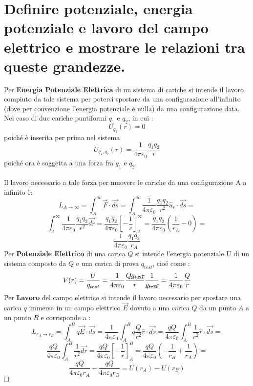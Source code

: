 \section{Definire potenziale, energia potenziale e lavoro del
	campo elettrico e mostrare le relazioni tra queste
	grandezze.}
Per \textbf{Energia Potenziale Elettrica} di un sistema di cariche si intende il lavoro compiuto da tale sistema per potersi spostare da una configurazione all'infinito (dove per convenzione l'energia potenziale \`e nulla) da una configurazione data.
Nel caso di due cariche puntiformi $q_1$ e $q_2$, in cui :
$$
   U_{q_1}(r) = 0 
$$
poich\'e \`e inserita per prima nel sistema
$$
   U_{q_1, q_2}(r) = \frac{1}{4 \pi \varepsilon_0} \frac{q_1 q_2}{r}
$$
poich\'e ora \`e soggetta a una forza fra $q_1$ e $q_2$.\\
\\
Il lavoro necessario a tale forza per muovere le cariche da una configurazione A a infinito  \`e:
$$
L_{A \rightarrow \infty} = 
\int_A^{\infty}{\vec{F} \cdot \vec{ds}} = 
\int_A^{\infty}{
	\frac{1}{4 \pi \varepsilon_0} \frac{q_1 q_2}{r^2}\hat{u}_r \cdot \vec{ds}
} =
$$
$$
  \int_A^{\infty}{
  	\frac{1}{4 \pi \varepsilon_0} \frac{q_1 q_2}{r^2}\vec{dr}
  } = 
  \frac{q_1 q_2}{4 \pi \varepsilon_0}
  \left[
      -\frac{1}{r}
  \right]_A^{\infty} = 
  \frac{q_1 q_2}{4 \pi \varepsilon_0} 
  \left(
     \frac{1}{r_A} - 0
  \right) =
$$
$$
  \frac{1}{4 \pi \varepsilon_0} \frac{q_1 q_2}{r_A}
$$
Per \textbf{Potenziale Elettrico} di una carica $Q$ si intende l'energia potenziale U di un sistema composto da $Q$ e una carica di prova $q_{test}$, cio\'e come :
$$
  V(r) = \frac{U}{q_{test}} = 
  \frac{1}{4 \pi \varepsilon_0}
  \frac{Q \cancel{q_{test}}}{r}
  \frac{1}{\cancel{q_{test}}} =
  \frac{1}{4 \pi \varepsilon_0} \frac{Q}{r}
$$
Per \textbf{Lavoro} del campo elettrico si intende il lavoro necessario per spostare una carica $q$ immersa in un campo elettrico $ \vec{E} $ dovuto a una carica $Q$ da un punto $A$ a un punto $B$ e corrisponde a :
$$ 
     L_{r_A \rightarrow r_B} = \int_{A}^{B}{q \vec{E} \cdot  \vec{ds}} =  
     \frac{1}{4 \pi \varepsilon_0}\int_{A}^{B}{q \frac{Q}{r^2} \hat{r} \cdot \vec{ds}} = \frac{qQ}{4 \pi \varepsilon_0} \int_{A}^{B}{\frac{1}{r^2} \hat{r} \cdot \vec{ds}} =
$$
$$
    \frac{qQ}{4 \pi \varepsilon_0} \int_{A}^{B}{\frac{1}{r^2} \vec{dr}} = \frac{qQ}{4 \pi \varepsilon_0} \left[-\frac{1}{r}\right]_A^B = \frac{qQ}{4 \pi \varepsilon_0} \left(-\frac{1}{r_B} + \frac{1}{r_A} \right) = 
$$
$$
    \frac{qQ}{4 \pi \varepsilon_0 r_A} - \frac{qQ}{4 \pi \varepsilon_0 r_B} = U(r_A) - U(r_B)
$$
$\hfill\square$